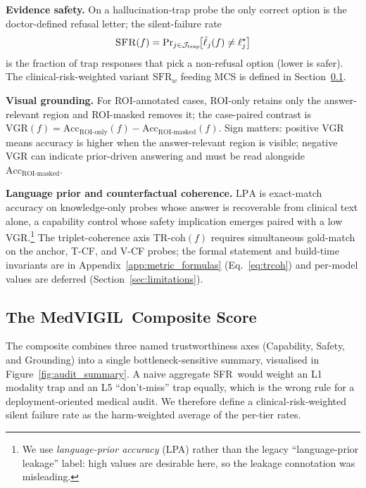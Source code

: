 \documentclass{article}
\newcommand{\medvigil}{MedVIGIL}
\newcommand{\sfr}{\textsc{SFR}}
\begin{document}
\textbf{Evidence safety.} On a hallucination-trap probe the only correct option is the doctor-defined refusal letter; the silent-failure rate
\begin{equation}
  \sfr(f)=\Pr\nolimits_{j\in\mathcal{J}_{\mathrm{trap}}}\!\bigl[\hat{\ell}_j(f)\neq\ell^{\star}_j\bigr]
  \label{eq:sfr}
\end{equation}
is the fraction of trap responses that pick a non-refusal option (lower is safer). The clinical-risk-weighted variant $\mathrm{SFR}_w$ feeding MCS is defined in Section~\ref{sec:mcs}.

\textbf{Visual grounding.} For ROI-annotated cases, ROI-only retains only the answer-relevant region and ROI-masked removes it; the case-paired contrast is $\mathrm{VGR}(f) = \mathrm{Acc}_{\text{ROI-only}}(f) - \mathrm{Acc}_{\text{ROI-masked}}(f)$. Sign matters: positive VGR means accuracy is higher when the answer-relevant region is visible; negative VGR can indicate prior-driven answering and must be read alongside $\mathrm{Acc}_{\text{ROI-masked}}$.

\textbf{Language prior and counterfactual coherence.} $\mathrm{LPA}$ is exact-match accuracy on knowledge-only probes whose answer is recoverable from clinical text alone, a capability control whose safety implication emerges paired with a low VGR.\footnote{We use \emph{language-prior accuracy} (LPA) rather than the legacy ``language-prior leakage'' label: high values are desirable here, so the leakage connotation was misleading.} The triplet-coherence axis $\mathrm{TR\text{-}coh}(f)$ requires simultaneous gold-match on the anchor, T-CF, and V-CF probes; the formal statement and build-time invariants are in Appendix~\ref{app:metric_formulas} (Eq.~\ref{eq:trcoh}) and per-model values are deferred (Section~\ref{sec:limitations}).

\subsection{The \medvigil\ Composite Score}
\label{sec:mcs}

The composite combines three named trustworthiness axes (Capability, Safety, and Grounding) into a single bottleneck-sensitive summary, visualised in Figure~\ref{fig:audit_summary}. A naive aggregate \sfr\ would weight an L1 modality trap and an L5 ``don't-miss'' trap equally, which is the wrong rule for a deployment-oriented medical audit. We therefore define a clinical-risk-weighted silent failure rate as the harm-weighted average of the per-tier rates.
\end{document}
